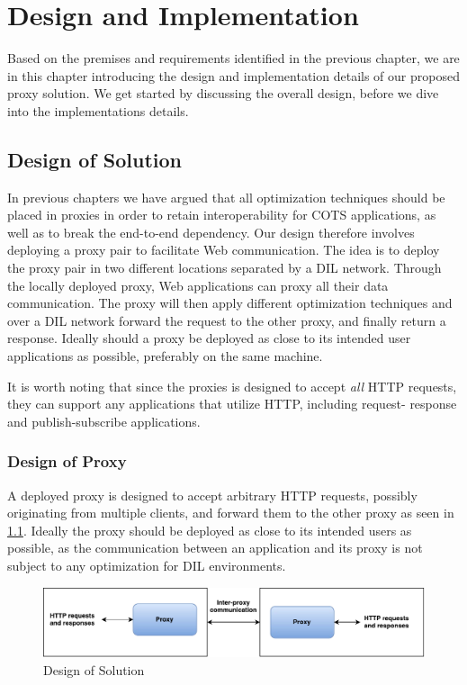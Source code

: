 \chapter{Design and Implementation}
\label{chapter:design}

Based on the premises and requirements identified in the previous chapter, we
are in this chapter introducing the design and implementation details of our
proposed proxy solution. We get started by discussing the overall design, before
we dive into the implementations details.

\section{Design of Solution}

In previous chapters we have argued that all optimization techniques should be
placed in proxies in order to retain interoperability for COTS applications, as
well as to break the end-to-end dependency. Our design therefore involves
deploying a proxy pair to facilitate Web communication. The idea is to deploy
the proxy pair in two different locations separated by a DIL network. Through
the locally deployed proxy, Web applications can proxy all their data
communication. The proxy will then apply different optimization techniques and
over a DIL network forward the request to the other proxy, and finally return a
response. Ideally should a proxy be deployed as close to its intended user
applications as possible, preferably on the same machine.


It is worth noting that since the proxies is designed to accept \textit{all} HTTP
requests, they can support any applications that utilize HTTP, including request-
response and publish-subscribe applications.


\subsection{Design of Proxy}

A deployed proxy is designed to accept arbitrary HTTP requests, possibly
originating from multiple clients, and forward them to the other proxy as seen
in \cref{figure:proxy_design}. Ideally the proxy should be deployed as close to
its intended users as possible, as the communication between an application and
its proxy is not subject to any optimization for DIL environments.

\begin{figure}[h]
\includegraphics[scale=0.55]{images/proxy_design.pdf}
\caption{Design of Solution}
\label{figure:proxy_design}
\end{figure}

